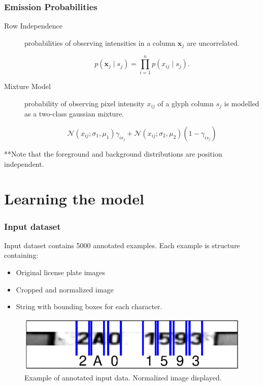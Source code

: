\documentclass{beamer}
\begin{document}
\begin{frame}
  \frametitle{Emission Probabilities}

\begin{description}
\item[Row Independence] probabilities of observing intensities in
  a column $\mathbf{x}_j$ are uncorrelated.

  \[p(\mathbf{x}_j \mid s_j) = \prod_{i=1}^np(x_{ij} \mid s_j).\] 

\item[Mixture Model] probability of observing pixel intensity $x_{ij}$
  of a glyph column $s_j$ is modelled as a two-class gaussian mixture.

\[
\mathcal{N}(x_{ij};\sigma_1,\mu_1)\gamma_{is_j}+\mathcal{N}(x_{ij};\sigma_2,\mu_2)(1-\gamma_{is_j})
\]
\end{description} 

**Note that the foreground and background distributions are position
independent.
\end{frame}

\section{Learning the model}

\begin{frame}
  \frametitle{Input dataset}
  Input dataset contains 5000 annotated examples. Each example is structure containing:
\begin{itemize}
  \item Original license plate images
  \item Cropped and normalized image
  \item String with bounding boxes for each character.
\end{itemize}

\begin{figure}
\includegraphics[width=\linewidth]{pics/input_example.eps}
\caption{Example of annotated input data. Normalized image displayed.}
\label{fig:distribution}
\end{figure}

\end{frame}
\end{document}

